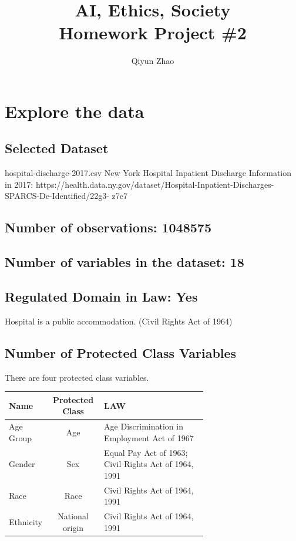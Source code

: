 \documentclass[
	letterpaper, %
]{jdf}
\author{Qiyun Zhao}
\title{AI, Ethics, Society\\Homework Project \#2}
\begin{document}
\maketitle

\section{Explore the data}
\subsection{Selected Dataset}
hospital-discharge-2017.csv \newline
New York Hospital Inpatient Discharge Information in 2017: https://health.data.ny.gov/dataset/Hospital-Inpatient-Discharges-SPARCS-De-Identified/22g3- z7e7
\subsection{Number of observations: 1048575}
\subsection{Number of variables in the dataset: 18}
\subsection{Regulated Domain in Law: Yes}
Hospital is a public accommodation. (Civil Rights Act of 1964)
\subsection{Number of Protected Class Variables}
There are four protected class variables.
\begin{jdftable}
\label{table:Example}
\small %
\begin{tabular}{@{} L{0.15\linewidth} c L{0.52\linewidth}}
\textbf{Name} & \textbf{Protected Class} & \textbf{LAW} \\
	\toprule[0.5pt]
	Age Group & Age & Age Discrimination in Employment Act of 1967\\
	\midrule
	Gender & Sex & Equal Pay Act of 1963; Civil Rights Act of 1964, 1991 \\
	\midrule
	Race &Race & Civil Rights Act of 1964, 1991\\
	\midrule
	Ethnicity & National origin &Civil Rights Act of 1964, 1991\\
\end{tabular}
\end{jdftable}
\end{document}
